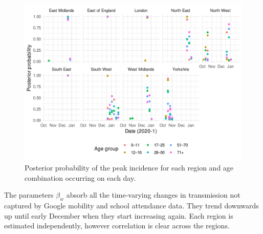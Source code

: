 \documentclass[thesis.tex]{subfiles}
\begin{document}
\begin{figure}
    \includegraphics{SEIR/CIS/p_peak}
    \caption[Posterior estimates of peak incidence timing]{%
        Posterior probability of the peak incidence for each region and age combination occurring on each day.
    }
    \label{SEIR:fig:peak-incidence}
\end{figure}


The parameters $\beta_w$ absorb all the time-varying changes in transmission not captured by Google mobility and school attendance data.
They trend downwards up until early December when they start increasing again.
Each region is estimated independently, however correlation is clear across the regions.
\end{document}

